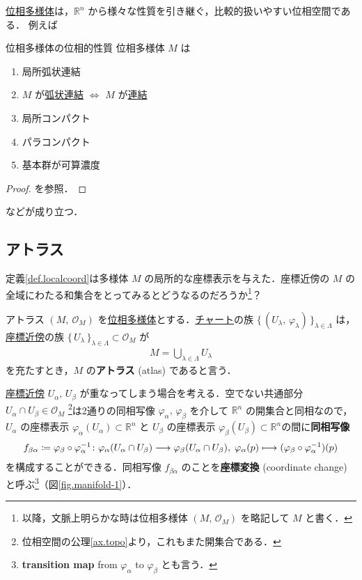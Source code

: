 \documentclass[geometry_main]{subfiles}
\begin{document}
\hyperref[def.topomani]{位相多様体}は，$\mathbb{R}^n$ から様々な性質を引き継ぐ，比較的扱いやすい位相空間である．
例えば
\begin{myprop}[label=prop:topomani-basic, breakable]{位相多様体の位相的性質}
	位相多様体 $M$ は
	\begin{enumerate}
		\item 局所弧状連結
		\item $M$ が\hyperref[def.joint]{弧状連結} $\iff$ $M$ が\hyperref[def.joint]{連結}
		\item 局所コンパクト
		\item パラコンパクト
		\item 基本群が可算濃度
	\end{enumerate}
\end{myprop}

\begin{proof}
	\cite[Proposition 11-16]{Lee12} を参照．

\end{proof}
などが成り立つ．

\subsection{アトラス}

定義\ref{def.localcoord}は多様体 $M$ の局所的な座標表示を与えた．座標近傍の $M$ の全域にわたる和集合をとってみるとどうなるのだろうか\footnote{以降，文脈上明らかな時は位相多様体 $(M,\, \mathscr{O}_M)$ を略記して $M$ と書く．}？
\begin{mydef}[label=def.atlas]{アトラス}
	$(M,\ \mathscr{O}_M)$ を\hyperref[def.topomani]{位相多様体}とする．\hyperref[def.localcoord]{チャート}の族 $\bigl\{\, (U_\lambda,\, \varphi_\lambda) \,\bigr\}_{\lambda \in \Lambda}$ は，\hyperref[def.localcoord]{座標近傍}の族 $\bigl\{\, U_\lambda \,\bigr\}_{\lambda \in \Lambda} \subset \mathscr{O}_M$ が
	\begin{align}
		M = \bigcup_{\lambda \in \Lambda} U_\lambda
	\end{align}
	を充たすとき，$M$ の\textbf{アトラス} (atlas) であると言う．
\end{mydef}
\hyperref[def.localcoord]{座標近傍}
$U_\alpha,\, U_\beta$ が重なってしまう場合を考える．空でない共通部分 $U_\alpha \cap U_\beta \in \mathscr{O}_M$ \footnote{位相空間の公理\ref{ax.topo}より，これもまた開集合である．}は2通りの同相写像 $\varphi_\alpha,\, \varphi_\beta$ を介して $\mathbb{R}^n$ の開集合と同相なので，$U_\alpha$ の座標表示 $\varphi_\alpha(U_\alpha) \subset \mathbb{R}^n$ と $U_\beta$ の座標表示 $\varphi_\beta(U_\beta) \subset \mathbb{R}^n$の間に\textbf{同相写像}
\begin{align}
	f_{\beta\alpha} \coloneqq \varphi_\beta \circ \varphi_\alpha^{-1} \colon \varphi_\alpha(U_\alpha \cap U_\beta) \longrightarrow \varphi_\beta(U_\alpha \cap U_\beta),\; \varphi_\alpha(p) \longmapsto (\varphi_\beta \circ \varphi_\alpha^{-1})(p)
\end{align}
を構成することができる．同相写像 $f_{\beta\alpha}$ のことを\textbf{座標変換} (coordinate change) と呼ぶ\footnote{\textbf{transition map} from $\varphi_\alpha$ to $\varphi_\beta$ とも言う．}（図\ref{fig.manifold-1}）．
\end{document}
